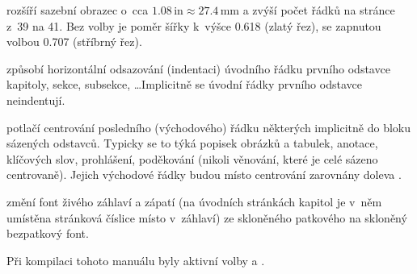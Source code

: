 \begin{description}
\label{opnarrowmargin} rozšíří sazební obrazec o~cca
  $1.08\,\mathrm{in} \approx 27.4\,\mathrm{mm}$ a zvýší počet řádků na stránce
  z~39 na 41. Bez volby  je poměr šířky k~výšce 0.618 (zlatý
  řez), se zapnutou volbou  0.707 (stříbrný řez).

\label{opindentfirst} způsobí horizontální odsazování
  (indentaci) úvodního řádku prvního odstavce kapitoly, sekce, subsekce,
  \ldots\@ Implicitně se úvodní řádky prvního odstavce neindentují.

\label{optfllastline} potlačí centrování posledního
  (východového) řádku některých implicitně do bloku sázených odstavců. Typicky
  se to týká popisek obrázků a tabulek, anotace, klíčových slov, prohlášení,
  poděkování (nikoli věnování, které je celé sázeno centrovaně). Jejich
  východové řádky budou místo centrování zarovnány doleva .

\label{optheadfootsans} změní font živého záhlaví a
  zápatí (na úvodních stránkách kapitol je v~něm umístěna stránková číslice
  místo v~záhlaví) ze skloněného patkového na skloněný bezpatkový font.
\end{description}

\noindent
Při kompilaci tohoto manuálu byly aktivní volby  a .

\endinput

